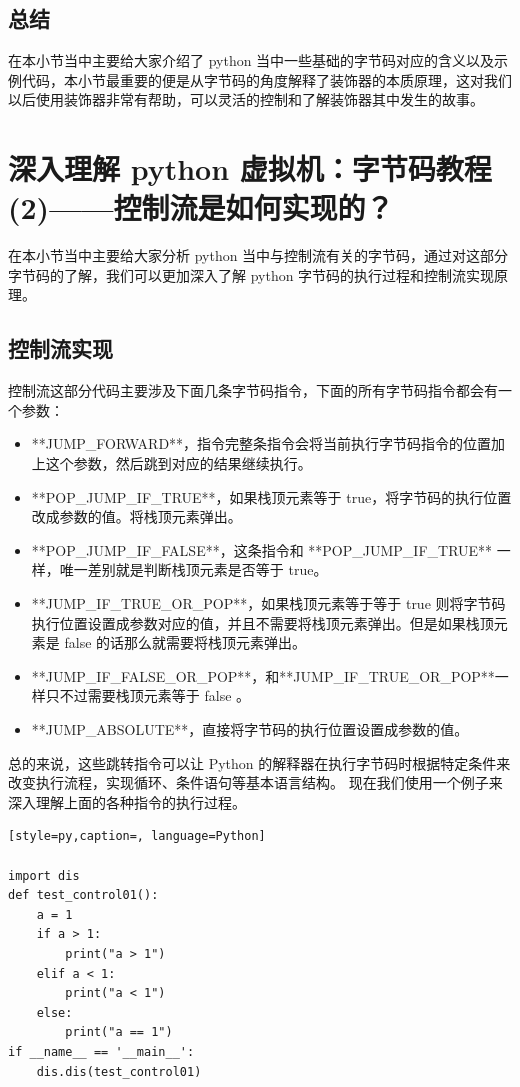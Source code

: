 \subsection{总结}
在本小节当中主要给大家介绍了 python 当中一些基础的字节码对应的含义以及示例代码，本小节最重要的便是从字节码的角度解释了装饰器的本质原理，这对我们以后使用装饰器非常有帮助，可以灵活的控制和了解装饰器其中发生的故事。


\section{深入理解 python 虚拟机：字节码教程(2)——控制流是如何实现的？}
在本小节当中主要给大家分析 python 当中与控制流有关的字节码，通过对这部分字节码的了解，我们可以更加深入了解 python 字节码的执行过程和控制流实现原理。
\subsection{控制流实现}
控制流这部分代码主要涉及下面几条字节码指令，下面的所有字节码指令都会有一个参数：
\begin{itemize}
\item **JUMP\_FORWARD**，指令完整条指令会将当前执行字节码指令的位置加上这个参数，然后跳到对应的结果继续执行。 
\item **POP\_JUMP\_IF\_TRUE**，如果栈顶元素等于 true，将字节码的执行位置改成参数的值。将栈顶元素弹出。 
\item **POP\_JUMP\_IF\_FALSE**，这条指令和 **POP\_JUMP\_IF\_TRUE** 一样，唯一差别就是判断栈顶元素是否等于 true。  
\item **JUMP\_IF\_TRUE\_OR\_POP**，如果栈顶元素等于等于 true 则将字节码执行位置设置成参数对应的值，并且不需要将栈顶元素弹出。但是如果栈顶元素是 false 的话那么就需要将栈顶元素弹出。 
\item **JUMP\_IF\_FALSE\_OR\_POP**，和**JUMP\_IF\_TRUE\_OR\_POP**一样只不过需要栈顶元素等于 false 。 
\item **JUMP\_ABSOLUTE**，直接将字节码的执行位置设置成参数的值。 
\end{itemize}
总的来说，这些跳转指令可以让 Python 的解释器在执行字节码时根据特定条件来改变执行流程，实现循环、条件语句等基本语言结构。
现在我们使用一个例子来深入理解上面的各种指令的执行过程。
\begin{lstlisting}[style=py,caption=, language=Python]

import dis
def test_control01():
    a = 1
    if a > 1:
        print("a > 1")
    elif a < 1:
        print("a < 1")
    else:
        print("a == 1")
if __name__ == '__main__':
    dis.dis(test_control01)
\end{lstlisting}
